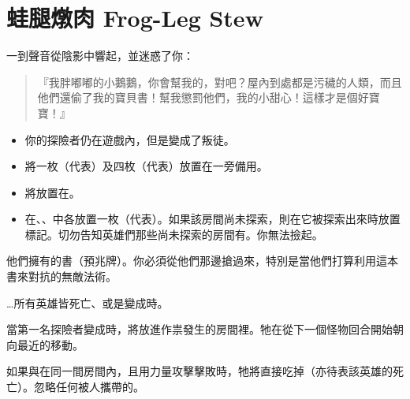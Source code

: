 
\chapter{蛙腿燉肉 Frog-Leg Stew}

\begin{HauntStory}
  一到聲音從陰影中響起，並迷惑了你：
  \begin{quote}
    『我胖嘟嘟的小鵝鵝，你會幫我的，對吧？屋內到處都是污穢的人類，而且他們還偷了我的寶貝書！幫我懲罰他們，我的小甜心！這樣才是個好寶寶！』
  \end{quote}
\end{HauntStory}

\vspace*{-1em}
\begin{itemize}
  \item 你的探險者仍在遊戲內，但是變成了叛徒。
  \item 將一枚（代表）及四枚（代表）放置在一旁備用。
  \item 將放置在。
  \item 在、、中各放置一枚（代表）。如果該房間尚未探索，則在它被探索出來時放置標記。切勿告知英雄們那些尚未探索的房間有。你無法撿起。
\end{itemize}

他們擁有的書（預兆牌）。你必須從他們那邊搶過來，特別是當他們打算利用這本書來對抗的無敵法術。

…所有英雄皆死亡、或是變成時。

當第一名探險者變成時，將放進作祟發生的房間裡。牠在從下一個怪物回合開始朝向最近的移動。

如果與在同一間房間內，且用力量攻擊擊敗時，牠將直接吃掉（亦待表該英雄的死亡）。忽略任何被人攜帶的。

\vfill\null\pagebreak



